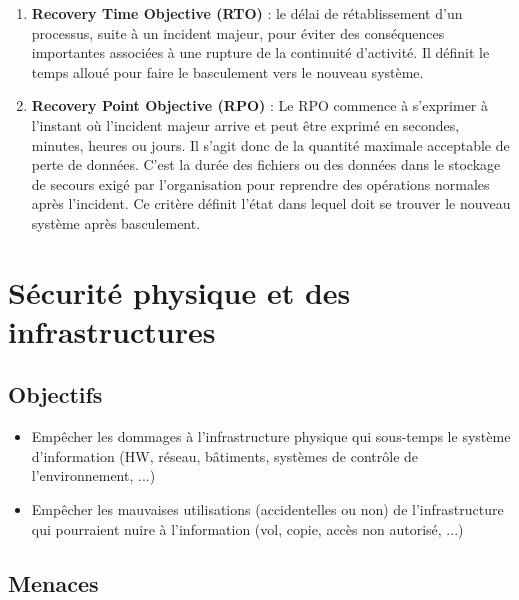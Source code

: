 \documentclass{report}
\begin{document}
\begin{enumerate}
    \item \textbf{Recovery Time Objective (RTO)} : le délai de rétablissement d'un processus, suite à un incident majeur, pour éviter des conséquences importantes associées à une rupture de la continuité d'activité. Il définit le temps alloué pour faire le basculement vers le nouveau système.

    \item \textbf{Recovery Point Objective (RPO)} : Le RPO commence à s'exprimer à l'instant où l'incident majeur arrive et peut être exprimé en secondes, minutes, heures ou jours. Il s'agit donc de la quantité maximale acceptable de perte de données. C'est la durée des fichiers ou des données dans le stockage de secours exigé par l'organisation pour reprendre des opérations normales après l'incident. Ce critère définit l'état dans lequel doit se trouver le nouveau système après basculement.
\end{enumerate}

\section{Sécurité physique et des infrastructures}

\subsection{Objectifs}

\begin{itemize}
    \item Empêcher les dommages à l'infrastructure physique qui sous-temps le système d'information (HW, réseau, bâtiments, systèmes de contrôle de l'environnement, ...)

    \item Empêcher les mauvaises utilisations (accidentelles ou non) de l'infrastructure qui pourraient nuire à l'information (vol, copie, accès non autorisé, ...)
\end{itemize}

\subsection{Menaces}
\end{document}
